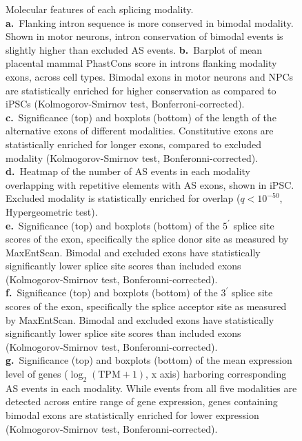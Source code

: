\clearpage
\thispagestyle{facingcaption}
\begin{figure}[h]
\captionsetup{labelformat=prev-page}
\caption[Molecular features of each splicing modality.]{
Molecular features of each splicing modality.\\
\textbf{a.}~Flanking intron sequence is more conserved in  bimodal modality. Shown in motor neurons,  intron conservation of bimodal events is slightly higher than excluded AS events.
\textbf{b.}~Barplot of mean placental mammal PhastCons score in introns flanking modality exons, across cell types. Bimodal exons in motor neurons  and NPCs are statistically enriched for higher conservation as compared to iPSCs (Kolmogorov-Smirnov test, Bonferroni-corrected).\\
\textbf{c.}~Significance (top) and boxplots (bottom) of the length of the alternative exons of different modalities. Constitutive exons are statistically enriched for longer exons, compared to excluded modality (Kolmogorov-Smirnov test, Bonferonni-corrected).\\
\textbf{d.}~Heatmap of the number of AS events in each modality overlapping with repetitive elements with AS exons, shown in iPSC. Excluded modality is statistically enriched for overlap ($q < 10^{-50}$, Hypergeometric test).\\
\textbf{e.}~Significance (top) and boxplots (bottom) of the $5^\prime$ splice site scores of the exon, specifically the splice donor site as measured by MaxEntScan. Bimodal and excluded exons have statistically significantly lower splice site scores than included exons (Kolmogorov-Smirnov test, Bonferonni-corrected).\\
\textbf{f.}~Significance (top) and boxplots (bottom) of the $3^\prime$ splice site scores of the exon, specifically the splice acceptor site as measured by MaxEntScan. Bimodal and excluded exons have statistically significantly lower splice site scores than included exons (Kolmogorov-Smirnov test, Bonferonni-corrected).\\
\textbf{g.}~Significance (top) and boxplots (bottom) of the mean expression level of genes ($\log_2(\mathrm{TPM}+1)$, x axis) harboring corresponding AS events in each modality. While events from all five modalities are detected across entire range of gene expression, genes containing bimodal exons are statistically enriched for lower expression (Kolmogorov-Smirnov test, Bonferonni-corrected).\\
}
\end{figure}
